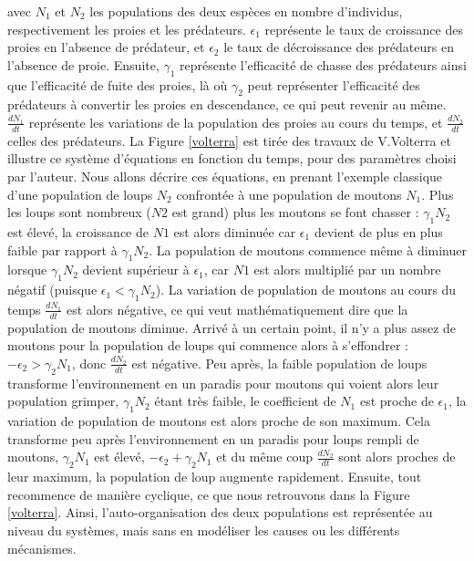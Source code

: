 		avec $N_1$ et $N_2$ les populations des deux espèces en nombre d'individus, respectivement les proies et les prédateurs. $\epsilon_1$ représente le taux de croissance des proies en l'absence de prédateur, et $\epsilon_2$ le taux de décroissance des prédateurs en l'absence de proie. Ensuite, $\gamma_1$ représente l'efficacité de chasse des prédateurs ainsi que l'efficacité de fuite des proies, là où $\gamma_2$ peut représenter l'efficacité des prédateurs à convertir les proies en descendance, ce qui peut revenir au même. $\frac{dN_1}{dt}$ représente les variations de la population des proies au cours du temps, et $\frac{dN_2}{dt}$ celles des prédateurs. La Figure \ref{volterra} est tirée des travaux de V.Volterra et illustre ce système d'équations en fonction du temps, pour des paramètres choisi par l'auteur. Nous allons décrire ces équations, en prenant l'exemple classique d'une population de loups $N_2$ confrontée à une population de moutons $N_1$. Plus les loups sont nombreux ($N2$ est grand) plus les moutons se font chasser : $\gamma_1 N_2$ est élevé, la croissance de $N1$ est alors diminuée car $\epsilon_1$ devient de plus en plus faible par rapport à $\gamma_1 N_2$. La population de moutons commence même à diminuer lorsque $\gamma_1 N_2$ devient supérieur à $\epsilon_1$, car $N1$ est alors multiplié par un nombre négatif (puisque $\epsilon_1 < \gamma_1 N_2$). La variation de population de moutons au cours du temps $\frac{dN_1}{dt}$ est alors négative, ce qui veut mathématiquement dire que la population de moutons diminue. Arrivé à un certain point, il n'y a plus assez de moutons pour la population de loups qui commence alors à s'effondrer : $-\epsilon_2 > \gamma_2 N_1$, donc $\frac{dN_2}{dt}$ est négative. Peu après, la faible population de loups transforme l'environnement en un paradis pour moutons qui voient alors leur population grimper, $\gamma_1 N_2$ étant très faible, le coefficient de $N_1$ est proche de $\epsilon_1$, la variation de population de moutons est alors proche de son maximum. Cela transforme peu après l'environnement en un paradis pour loups rempli de moutons, $\gamma_2 N_1$ est élevé, $- \epsilon_2 + \gamma_2 N_1$ et du même coup $\frac{dN_2}{dt}$ sont alors proches de leur maximum, la population de loup augmente rapidement. Ensuite, tout recommence de manière cyclique, ce que nous retrouvons dans la Figure \ref{volterra}. Ainsi, l'auto-organisation des deux populations est représentée au niveau du systèmes, mais sans en modéliser les causes ou les différents mécanismes.
		
